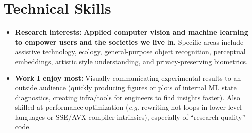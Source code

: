\documentclass[10pt,letterpaper]{article}
\begin{document}
\section*{Technical Skills}
\vspace{-4pt}
\begin{itemize}
\item \textbf{Research interests: Applied computer vision and machine learning to empower users and the societies we live in.} Specific areas include assistive technology, ecology, general-purpose object recognition, perceptual embeddings, artistic style understanding, and privacy-preserving biometrics.
\item \textbf{Work I enjoy most:} Visually communicating experimental results to an outside audience (quickly producing figures or plots of internal ML state diagnostics, creating infra/tools for engineers to find insights faster). Also skilled at performance optimization (\emph{e.g.} rewriting hot loops in lower-level languages or SSE/AVX compiler intrinsics), especially of ``research-quality'' code.


\end{itemize}
\end{document}
